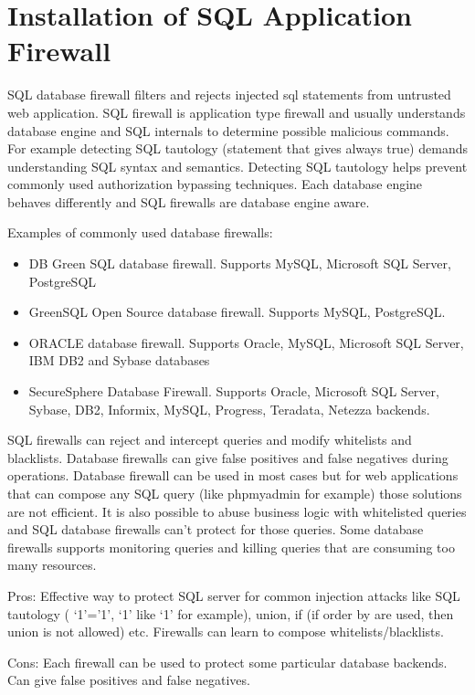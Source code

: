 \section{Installation of SQL Application Firewall}
SQL database firewall filters and rejects injected sql statements from untrusted web application. SQL firewall is application type firewall and usually understands database engine and SQL internals to determine possible malicious commands. For example detecting  SQL tautology (statement that gives always true) demands understanding SQL syntax and semantics. Detecting SQL tautology helps prevent commonly used authorization bypassing techniques.
Each database engine behaves differently and SQL firewalls are database engine aware.


Examples of commonly used database firewalls:
\begin{itemize}
\item DB Green SQL database firewall. Supports MySQL, Microsoft SQL Server, PostgreSQL
\item GreenSQL Open Source database firewall. Supports MySQL, PostgreSQL.
\item ORACLE database firewall. Supports Oracle, MySQL, Microsoft SQL Server, IBM DB2 and Sybase databases
\item SecureSphere Database Firewall. Supports Oracle, Microsoft SQL Server, Sybase, DB2, Informix, MySQL, Progress, Teradata, Netezza backends.
\end{itemize}

SQL firewalls can reject and intercept queries and modify whitelists and blacklists. Database firewalls can give false positives and false negatives during operations. Database firewall can be used in most cases but for web applications that can compose any SQL query (like  phpmyadmin for example) those solutions are not efficient. It is also possible to abuse business logic with whitelisted queries and SQL database firewalls can’t protect for those queries.
Some database firewalls supports monitoring queries and killing queries that are consuming too many resources.

Pros:
Effective way to protect SQL server for common injection attacks like SQL tautology ( ‘1’=’1’, ‘1’ like ‘1’ for example), union, if (if order by are used, then union is not allowed) etc.
Firewalls can learn to compose whitelists/blacklists.

Cons:
Each firewall can be used to protect some particular database backends.
Can give false positives and false negatives.

